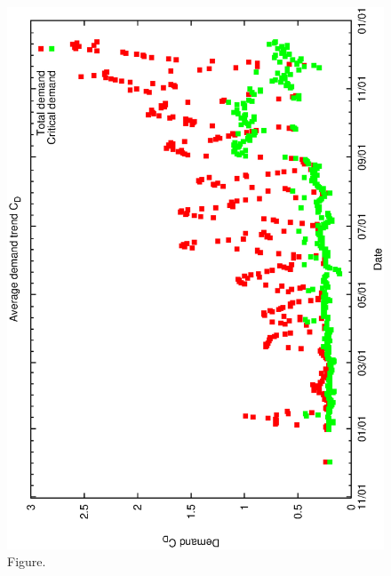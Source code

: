 \documentclass[12pt,a4paper]{article}
\begin{document}
\begin{figure}[htbp]
 \begin{center}
  \includegraphics[scale=1.0, angle=0]{figures/cdtrend.eps}
 \end{center}
  \caption[Figure.]
{Figure.}
\end{figure}
\clearpage
\end{document}

